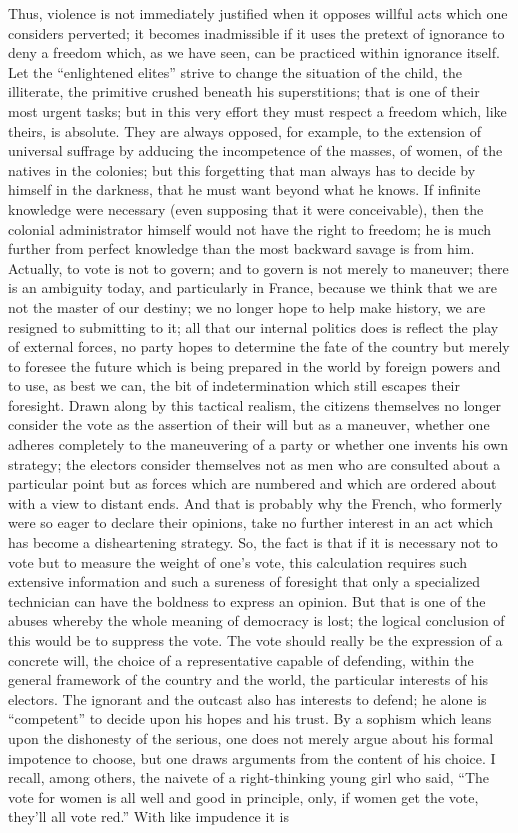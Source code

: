 \documentclass[11pt]{article}
\begin{document}
{{Thus, violence is not immediately justified when it opposes willful acts which one considers perverted; it becomes inadmissible if it uses the pretext of ignorance to deny a freedom which, as we have seen, can be practiced within ignorance itself. Let the “enlightened elites” strive to change the situation of the child, the illiterate, the primitive crushed beneath his superstitions; that is one of their most urgent tasks; but in this very effort they must respect a freedom which, like theirs, is absolute. They are always opposed, for example, to the extension of universal suffrage by adducing the incompetence of the masses, of women, of the natives in the colonies; but this forgetting that man always has to decide by himself in the darkness, that he must want beyond what he knows. If infinite knowledge were necessary (even supposing that it were conceivable), then the colonial administrator himself would not have the right to freedom; he is much further from perfect knowledge than the most backward savage is from him. Actually, to vote is not to govern; and to govern is not merely to maneuver; there is an ambiguity today, and particularly in France, because we think that we are not the master of our destiny; we no longer hope to help make history, we are resigned to submitting to it; all that our internal politics does is reflect the play of external forces, no party hopes to determine the fate of the country but merely to foresee the future which is being prepared in the world by foreign powers and to use, as best we can, the bit of indetermination which still escapes their foresight. Drawn along by this tactical realism, the citizens themselves no longer consider the vote as the assertion of their will but as a maneuver, whether one adheres completely to the maneuvering of a party or whether one invents his own strategy; the electors consider themselves not as men who are consulted about a particular point but as forces which are numbered and which are ordered about with a view to distant ends. And that is probably why the French, who formerly were so eager to declare their opinions, take no further interest in an act which has become a disheartening strategy. So, the fact is that if it is necessary not to vote but to measure the weight of one’s vote, this calculation requires such extensive information and such a sureness of foresight that only a specialized technician can have the boldness to express an opinion. But that is one of the abuses whereby the whole meaning of democracy is lost; the logical conclusion of this would be to suppress the vote. The vote should really be the expression of a concrete will, the choice of a representative capable of defending, within the general framework of the country and the world, the particular interests of his electors. The ignorant and the outcast also has interests to defend; he alone is “competent” to decide upon his hopes and his trust. By a sophism which leans upon the dishonesty of the serious, one does not merely argue about his formal impotence to choose, but one draws arguments from the content of his choice. I recall, among others, the naivete of a right-thinking young girl who said, “The vote for women is all well and good in principle, only, if women get the vote, they’ll all vote red.” With like impudence it is }}
\end{document}
